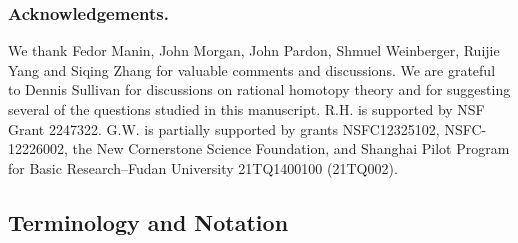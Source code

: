 \documentclass[11pt]{amsart}
\theoremstyle{definition}
\numberwithin{equation}{section}
\numberwithin{equation}{section}
\begin{document}
\medskip

\subsubsection*{Acknowledgements.}
We thank Fedor Manin, John Morgan, John Pardon, Shmuel Weinberger, Ruijie Yang and Siqing Zhang for valuable comments and discussions. We are grateful to Dennis Sullivan for discussions on rational homotopy theory and for suggesting several of the questions studied in this manuscript. R.H. is supported by 
NSF Grant 2247322. G.W. is partially supported by grants NSFC12325102, NSFC-12226002, the New Cornerstone Science Foundation, and Shanghai
Pilot Program for Basic Research–Fudan University 21TQ1400100 (21TQ002).

\tableofcontents

\subsection*{Terminology and Notation}
\end{document}
